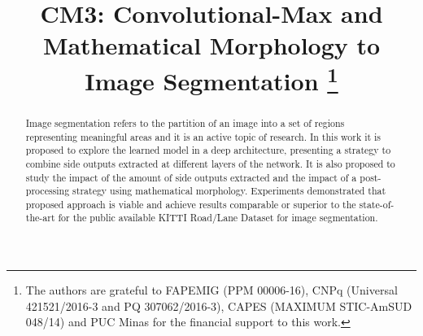 \documentclass[conference]{IEEEtran}
\begin{document}
\title{CM3: Convolutional-Max and Mathematical Morphology to Image Segmentation
\thanks{The authors are grateful to FAPEMIG (PPM 00006-16), CNPq (Universal 421521/2016-3 and PQ 307062/2016-3), CAPES (MAXIMUM STIC-AmSUD 048/14) and PUC Minas for the financial support to this work.}
}

\author{
}

\maketitle

\begin{abstract}
Image segmentation refers to the partition of an image into a set of regions representing meaningful areas and it is an active topic of research.  In this work it is proposed to explore the learned model in a deep architecture, presenting a strategy to combine side outputs extracted at different layers of the network. It is also proposed to study the impact of the amount of side outputs extracted and the impact of a post-processing strategy using mathematical morphology. Experiments demonstrated that proposed approach is viable and  achieve results comparable or superior to the state-of-the-art for the public available KITTI Road/Lane Dataset for image segmentation.
\end{abstract}












\end{document}
